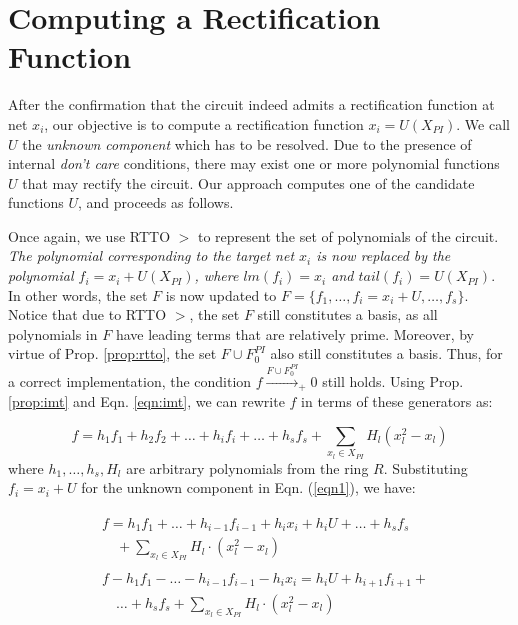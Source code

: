 \section{Computing a Rectification Function}
\label{sec:unknown}

After the confirmation that the circuit indeed admits a rectification
function at net $x_i$, our objective is to compute a rectification
function $x_i = U(X_{PI})$. We call $U$ the {\it unknown component}
which has to be resolved. Due to the presence of internal {\it don't
  care} conditions, there may exist one or more polynomial functions
$U$ that may rectify the circuit. Our approach computes one of the
candidate functions $U$, and proceeds as follows.


Once again, we use RTTO $>$ to represent the set
of polynomials of the circuit. {\it The polynomial corresponding to the
target net $x_i$ is now replaced by the polynomial $f_i = x_i + U(X_{PI})$,
where $lm(f_i) = x_i$ and $tail(f_i)=U(X_{PI})$}. In other words, the
set $F$ is now updated to
$F=\{f_1,\dots,f_i=x_i+U,\dots,f_s\}$. Notice that due to RTTO $>$, 
the set $F$ still constitutes a \Grobner basis, as all 
polynomials in $F$ have leading terms that are relatively
prime. Moreover, by virtue of Prop. \ref{prop:rtto}, the set $F\cup
F_{0}^{PI}$ also still constitutes a \Grobner basis. 
Thus, for a correct implementation, the condition $f\xrightarrow{F\cup
  F_{0}^{PI}}_+0$ still holds. Using Prop. 
\ref{prop:imt} and Eqn. \ref{eqn:imt}, we can rewrite $f$ in terms of
these generators as:    

\begin{equation}\label{eqn1}
f = h_1f_1 + h_2f_2 + \dots+h_if_i+\dots+h_sf_s + \sum_{x_l\in X_{PI}} H_l(x_l^2-x_l)
\end{equation}
where $h_1,\dots,h_s,H_l$ are arbitrary polynomials from the ring
$R$. Substituting $f_i = x_i + U$ for the unknown component in
Eqn. (\ref{eqn1}), we have: 

\begin{eqnarray}
  \begin{split}
    & f  = h_1f_1 +\dots+h_{i-1}f_{i-1}+h_ix_i+h_iU+\dots+h_sf_s\\
    & \quad +\sum_{x_l\in X_{PI}} H_l \cdot(x_l^2-x_l)
  \end{split}\\  
  \begin{split}
    & f - h_1f_1 -\dots-h_{i-1}f_{i-1}-h_ix_i = h_iU+h_{i+1}f_{i+1}+\\
    & \quad \dots+h_sf_s +\sum_{x_l\in X_{PI}} H_l \cdot (x_l^2-x_l) \label{eqn2}
\end{split}
\end{eqnarray}

